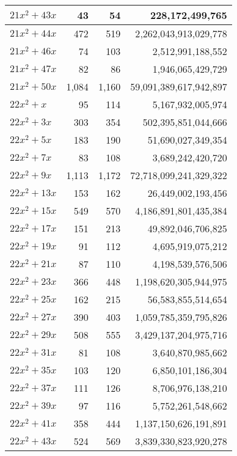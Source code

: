 \documentclass[a4paper]{amsproc}
\theoremstyle{plain}
\theoremstyle{named}
\begin{document}
\begin{longtable}{ | l | r | r | r | }
$21x^2 + 43x$ & 43 & 54 & 228{,}172{,}499{,}765 \\ \hline
$21x^2 + 44x$ & 472 & 519 & 2{,}262{,}043{,}913{,}029{,}778 \\ \hline
$21x^2 + 46x$ & 74 & 103 & 2{,}512{,}991{,}188{,}552 \\ \hline
$21x^2 + 47x$ & 82 & 86 & 1{,}946{,}065{,}429{,}729 \\ \hline
$21x^2 + 50x$ & 1{,}084 & 1{,}160 & 59{,}091{,}389{,}617{,}942{,}897 \\ \hline
$22x^2 + x$ & 95 & 114 & 5{,}167{,}932{,}005{,}974 \\ \hline
$22x^2 + 3x$ & 303 & 354 & 502{,}395{,}851{,}044{,}666 \\ \hline
$22x^2 + 5x$ & 183 & 190 & 51{,}690{,}027{,}349{,}354 \\ \hline
$22x^2 + 7x$ & 83 & 108 & 3{,}689{,}242{,}420{,}720 \\ \hline
$22x^2 + 9x$ & 1{,}113 & 1{,}172 & 72{,}718{,}099{,}241{,}329{,}322 \\ \hline
$22x^2 + 13x$ & 153 & 162 & 26{,}449{,}002{,}193{,}456 \\ \hline
$22x^2 + 15x$ & 549 & 570 & 4{,}186{,}891{,}801{,}435{,}384 \\ \hline
$22x^2 + 17x$ & 151 & 213 & 49{,}892{,}046{,}706{,}825 \\ \hline
$22x^2 + 19x$ & 91 & 112 & 4{,}695{,}919{,}075{,}212 \\ \hline
$22x^2 + 21x$ & 87 & 110 & 4{,}198{,}539{,}576{,}506 \\ \hline
$22x^2 + 23x$ & 366 & 448 & 1{,}198{,}620{,}305{,}944{,}975 \\ \hline
$22x^2 + 25x$ & 162 & 215 & 56{,}583{,}855{,}514{,}654 \\ \hline
$22x^2 + 27x$ & 390 & 403 & 1{,}059{,}785{,}359{,}795{,}826 \\ \hline
$22x^2 + 29x$ & 508 & 555 & 3{,}429{,}137{,}204{,}975{,}716 \\ \hline
$22x^2 + 31x$ & 81 & 108 & 3{,}640{,}870{,}985{,}662 \\ \hline
$22x^2 + 35x$ & 103 & 120 & 6{,}850{,}101{,}186{,}304 \\ \hline
$22x^2 + 37x$ & 111 & 126 & 8{,}706{,}976{,}138{,}210 \\ \hline
$22x^2 + 39x$ & 97 & 116 & 5{,}752{,}261{,}548{,}662 \\ \hline
$22x^2 + 41x$ & 358 & 444 & 1{,}137{,}150{,}626{,}191{,}891 \\ \hline
$22x^2 + 43x$ & 524 & 569 & 3{,}839{,}330{,}823{,}920{,}278 \\ \hline

\end{longtable}
\end{document}

